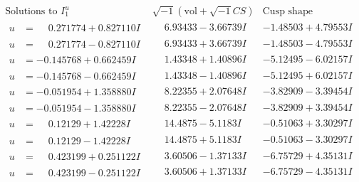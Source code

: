 \documentclass[1p]{elsarticle_modified}
\theoremstyle{definition}
\newcommand{\I}{\sqrt{-1}}
\begin{document}
$$\begin{array}{c|c|c}  
\text{Solutions to }I^u_{1}& \I (\text{vol} + \sqrt{-1}CS) & \text{Cusp shape}\\
 \hline 
\begin{aligned}
u &= \phantom{-}0.271774 + 0.827110 I\end{aligned}
 & \phantom{-}6.93433 - 3.66739 I & -1.48503 + 4.79553 I \\ \hline\begin{aligned}
u &= \phantom{-}0.271774 - 0.827110 I\end{aligned}
 & \phantom{-}6.93433 + 3.66739 I & -1.48503 - 4.79553 I \\ \hline\begin{aligned}
u &= -0.145768 + 0.662459 I\end{aligned}
 & \phantom{-}1.43348 + 1.40896 I & -5.12495 - 6.02157 I \\ \hline\begin{aligned}
u &= -0.145768 - 0.662459 I\end{aligned}
 & \phantom{-}1.43348 - 1.40896 I & -5.12495 + 6.02157 I \\ \hline\begin{aligned}
u &= -0.051954 + 1.358880 I\end{aligned}
 & \phantom{-}8.22355 + 2.07648 I & -3.82909 - 3.39454 I \\ \hline\begin{aligned}
u &= -0.051954 - 1.358880 I\end{aligned}
 & \phantom{-}8.22355 - 2.07648 I & -3.82909 + 3.39454 I \\ \hline\begin{aligned}
u &= \phantom{-}0.12129 + 1.42228 I\end{aligned}
 & \phantom{-}14.4875 - 5.1183 I & -0.51063 + 3.30297 I \\ \hline\begin{aligned}
u &= \phantom{-}0.12129 - 1.42228 I\end{aligned}
 & \phantom{-}14.4875 + 5.1183 I & -0.51063 - 3.30297 I \\ \hline\begin{aligned}
u &= \phantom{-}0.423199 + 0.251122 I\end{aligned}
 & \phantom{-}3.60506 - 1.37133 I & -6.75729 + 4.35131 I \\ \hline\begin{aligned}
u &= \phantom{-}0.423199 - 0.251122 I\end{aligned}
 & \phantom{-}3.60506 + 1.37133 I & -6.75729 - 4.35131 I \\ \hline\begin{aligned}

\end{aligned}
\end{array}$$
\end{document}
